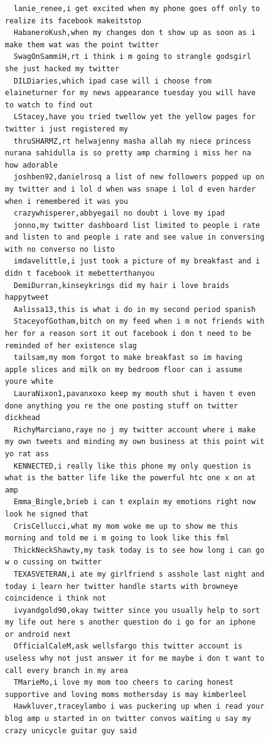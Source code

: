 \begin{figure}[htpb]
\begin{verbatim}
  lanie_renee,i get excited when my phone goes off only to realize its facebook makeitstop
  HabaneroKush,when my changes don t show up as soon as i make them wat was the point twitter
  SwagOnSammiH,rt i think i m going to strangle godsgirl she just hacked my twitter
  DILDiaries,which ipad case will i choose from elaineturner for my news appearance tuesday you will have to watch to find out
  LStacey,have you tried twellow yet the yellow pages for twitter i just registered my
  thruSHARMZ,rt helwajenny masha allah my niece princess nurana sahidulla is so pretty amp charming i miss her na how adorable
  joshben92,danielrosq a list of new followers popped up on my twitter and i lol d when was snape i lol d even harder when i remembered it was you
  crazywhisperer,abbyegail no doubt i love my ipad
  jonno,my twitter dashboard list limited to people i rate and listen to and people i rate and see value in conversing with no converso no listo
  imdavelittle,i just took a picture of my breakfast and i didn t facebook it mebetterthanyou
  DemiDurran,kinseykrings did my hair i love braids happytweet
  Aalissa13,this is what i do in my second period spanish
  StaceyofGotham,bitch on my feed when i m not friends with her for a reason sort it out facebook i don t need to be reminded of her existence slag
  tailsam,my mom forgot to make breakfast so im having apple slices and milk on my bedroom floor can i assume youre white
  LauraNixon1,pavanxoxo keep my mouth shut i haven t even done anything you re the one posting stuff on twitter dickhead
  RichyMarciano,raye no j my twitter account where i make my own tweets and minding my own business at this point wit yo rat ass
  KENNECTED,i really like this phone my only question is what is the batter life like the powerful htc one x on at amp
  Emma_Bingle,brieb i can t explain my emotions right now look he signed that
  CrisCellucci,what my mom woke me up to show me this morning and told me i m going to look like this fml
  ThickNeckShawty,my task today is to see how long i can go w o cussing on twitter
  TEXASVETERAN,i ate my girlfriend s asshole last night and today i learn her twitter handle starts with browneye coincidence i think not
  ivyandgold90,okay twitter since you usually help to sort my life out here s another question do i go for an iphone or android next
  OfficialCaleM,ask wellsfargo this twitter account is useless why not just answer it for me maybe i don t want to call every branch in my area
  TMarieMo,i love my mom too cheers to caring honest supportive and loving moms mothersday is may kimberleel
  Hawkluver,traceylambo i was puckering up when i read your blog amp u started in on twitter convos waiting u say my crazy unicycle guitar guy said

\end{verbatim}
\end{figure}
